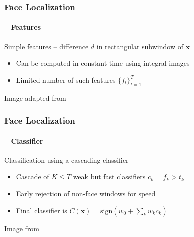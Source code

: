 \documentclass[xetex,professionalfont]{beamer}
\renewcommand{\vec}[1]{\ensuremath{\mathbf{#1}}}
\newcommand{\vx}{\vec{x}}
\begin{document}
\begin{frame}
\frametitle{Face Localization}
\framesubtitle{\cite{viola2001} -- Features}

Simple features -- difference $d$ in rectangular subwindow of $\vx$
\begin{itemize}
    \item Can be computed in constant time using integral images
    \item Limited number of such features $\{f_t\}_{t=1}^T$
\end{itemize}

\bigskip
\begin{center}
    {\centering Image adapted from \cite{prince12}}
\end{center}

\end{frame}


\begin{frame}
\frametitle{Face Localization}
\framesubtitle{\cite{viola2001} -- Classifier}

Classification using a cascading classifier
\begin{itemize}
    \item Cascade of $K\leq T$ weak but fast classifiers $c_k=f_k>t_k$
    \item Early rejection of non-face windows for speed %
    \item Final classifier is $C(\vx)=\text{sign}(w_0+\sum_k w_kc_k)$ %
\end{itemize}

\medskip
\begin{center}
    {\centering Image from \cite{prince12}}
\end{center}

\end{frame}
\end{document}
